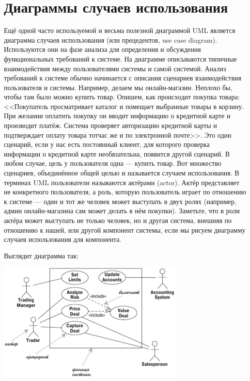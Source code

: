 \documentclass{../../text-style}
\begin{document}
\section{Диаграммы случаев использования}

Ещё одной часто используемой и весьма полезной диаграммой UML является диаграмма случаев использования (или прецедентов, use case diagram). Используются они на фазе анализа для определения и обсуждения функциональных требований к системе. На диаграмме описываются типичные взаимодействия между пользователями системы и самой системой. Анализ требований к системе обычно начинается с описания сценариев взаимодействия пользователя и системы. Например, делаем мы онлайн-магазин. Неплохо бы, чтобы там было можно купить товар. Опишем, как происходит покупка товара: <<Покупатель просматривает каталог и помещает выбранные товары в корзину. При желании оплатить покупку он вводит информацию о кредитной карте и производит платёж. Система проверяет авторизацию кредитной карты и подтверждает оплату товара тотчас же и по электронной почте>>. Это один сценарий, если у нас есть постоянный клиент, для которого проверка информации о кредитной карте необязательна, появится другой сценарий. В любом случае, цель у пользователя одна --- купить товар. Вот множество сценариев, объединённое общей целью и называется случаем использования. В терминах UML пользователи называются актёрами (actor). Актёр представляет не конкретного пользователя, а роль, которую пользователь играет по отношению к системе --- один и тот же человек может выступать в двух ролях (например, админ онлайн-магазина сам может делать в нём покупки). Заметьте, что в роли актёра может выступать не только человек, но и другая система, внешняя по отношению к нашей, или другой компонент системы, если мы рисуем диаграмму случаев использования для компонента. 

Выглядит диаграмма так:

\begin{center}
    \includegraphics[width=0.7\textwidth]{useCaseDiagram.png}
\end{center}
\end{document}
